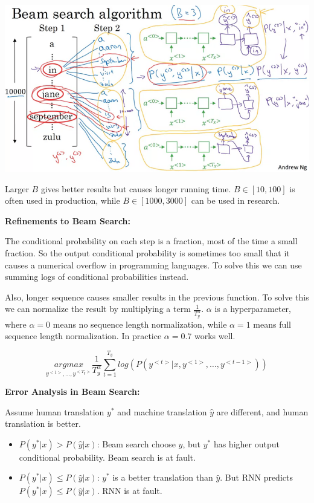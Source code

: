 \documentclass{article}
\begin{document}
\begin{center}
\includegraphics[scale=0.3]{./images/beam_search.png}
\end{center}

\noindent Larger \(B\) gives better results but causes longer running time. \(B \in [10, 100]\) is often used in production, while \(B \in [1000, 3000]\) can be used in research.

\bigskip

\noindent \textbf{Refinements to Beam Search:}

\noindent The conditional probability on each step is a fraction, most of the time a small fraction. So the output conditional probability is sometimes too small that it causes a numerical overflow in programming languages. To solve this we can use summing logs of conditional probabilities instead.

\bigskip

\noindent Also, longer sequence causes smaller results in the previous function. To solve this we can normalize the result by multiplying a term \(\frac{1}{T_{y}^{\alpha}}\). \(\alpha\) is a hyperparameter, where \(\alpha = 0\) means no sequence length normalization, while \(\alpha = 1\) means full sequence length normalization. In practice \(\alpha = 0.7\) works well.

\[\underset{y^{<1>}, \dots, y^{<T_{y}>}}{argmax} \frac{1}{T_{y}^{\alpha}} \sum_{t = 1}^{T_{y}} log(P(y^{<t>} | x, y^{<1>}, \dots, y^{<t - 1>}))\]

\noindent \textbf{Error Analysis in Beam Search:}

\noindent Assume human translation \(y^{*}\) and machine translation \(\hat{y}\) are different, and human translation is better.

\begin{itemize}
    \item \(P(y^{*} | x) > P(\hat{y} | x)\): Beam search choose \(\hat{y}\), but \(y^{*}\) has higher output conditional probability. Beam search is at fault.
    \item \(P(y^{*} | x) \leq P(\hat{y} | x)\): \(y^{*}\) is a better translation than \(\hat{y}\). But RNN predicts \(P(y^{*} | x) \leq P(\hat{y} | x)\). RNN is at fault.
\end{itemize}
\end{document}
